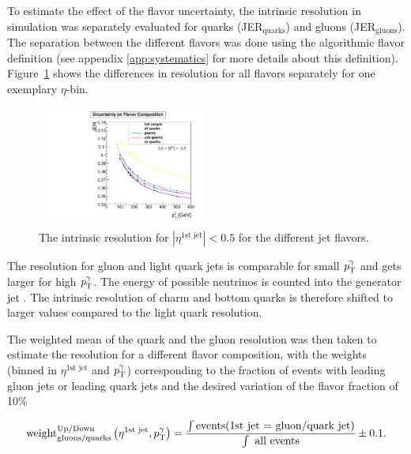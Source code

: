 To estimate the effect of the flavor uncertainty, the intrinsic resolution in simulation was separately evaluated for quarks (JER$_\text{quarks}$) and gluons (JER$_\text{gluons}$). 
The separation between the different flavors was done using the algorithmic flavor definition (see appendix \ref{app:systematics} for more details about this definition).
\mbox{Figure \ref{fig:ResolutionDifferences}} shows the differences in resolution for all flavors separately for one exemplary $\eta$-bin.
\begin{figure}[tp]
  \centering

      \includegraphics[width=0.50\textwidth]{figures/resolution/systematicUncertainties/Resolution_for_1_eta_bin_FlavorUncertainty_RMS99.pdf}
 
  \caption{The intrinsic resolution for $|\eta^{\text{1st jet}}| < 0.5$ for the different jet flavors.}  
  \label{fig:ResolutionDifferences}
\end{figure}
The resolution for gluon and light quark jets is comparable for small $p_{\text{T}}^{\gamma}$ and gets larger for high $p_{\text{T}}^{\gamma}$.
The energy of possible neutrinos is counted into the generator jet \pt. 
The intrinsic resolution of charm and bottom quarks is therefore shifted to larger values compared to the light quark resolution.


The weighted mean of the quark and the gluon resolution was then taken to estimate the resolution for a different flavor composition, 
with the weights (binned in $\eta^{\text{1st jet}}$ and $p_{\text{T}}^{\gamma}$) 
corresponding to the fraction of events with leading gluon jets or leading quark jets and the desired variation of the flavor fraction of 10\% 

\begin{equation}
\label{FlavorWeights}
 \text{weight}^{\text{Up/Down}}_{\text{gluons/quarks}} \left(\eta^{\text{1st jet}},p_{\text{T}}^{\gamma} \right) = \frac{\int\text{events(1st jet = gluon/quark jet)}}{\int\text{ all events}} \pm 0.1.
\end{equation}

